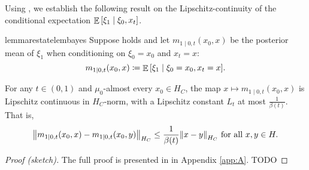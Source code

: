 Using , we establish the following result on the Lipschitz-continuity of the conditional expectation \(\mathop{\mathbb{E}}\qty[ \xi_{1} \mid \xi_{0}, x_{t}]\).

\begin{restatable}{lemma}{restatelembayes}\label{lem:bayes}
  Suppose  holds and let \(m_{1 \mid 0, t}(x_{0}, x)\) be the posterior mean of \(\xi_{1}\) when conditioning on \(\xi_{0} = x_{0}\) and \(x_{t} = x\):
  \[
    m_{1 \mid 0, t}(x_{0}, x) \coloneqq \mathop{\mathbb{E}}\qty[ \xi_{1} \mid \xi_{0} = x_{0}, x_{t} = x ].
  \]

  For any \(t \in (0, 1)\) and \(\mu_{0}\)-almost every \(x_{0} \in H_{C}\), the map \(x \mapsto m_{1 \mid 0, t}(x_{0}, x)\) is Lipschitz continuous in \(H_{C}\)-norm, with a Lipschitz constant \(L_{t}\) at most \(\frac{1}{\beta(t)}\). That is,
  \[
    \norm{m_{1 \mid 0, t}(x_{0}, x) - m_{1 \mid 0, t}(x_{0}, y)}_{H_{C}} \leq \frac{1}{\beta(t)}\norm{x - y}_{H_{C}} \text{ for all } x, y \in H.
  \]
\end{restatable}
\begin{proof}[Proof (sketch)]
  The full proof is presented in  in Appendix \ref{app:A}. TODO
\end{proof}




